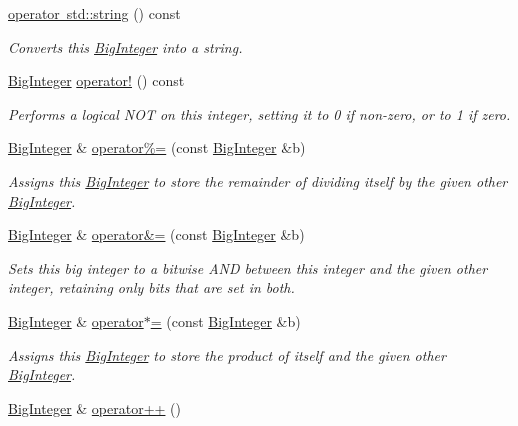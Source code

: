 \begin{DoxyCompactItemize}
\mbox{\hyperlink{classBigInteger_a3888dcd59dd5acd1ca5b9bee4c2e252a}{operator std\+::string}} () const
\begin{DoxyCompactList}\small\item\em Converts this \mbox{\hyperlink{classBigInteger}{Big\+Integer}} into a string. \end{DoxyCompactList}\item 
\mbox{\hyperlink{classBigInteger}{Big\+Integer}} \mbox{\hyperlink{classBigInteger_a4e89621e8562bf05700c80653d1b046a}{operator!}} () const
\begin{DoxyCompactList}\small\item\em Performs a logical N\+OT on this integer, setting it to 0 if non-\/zero, or to 1 if zero. \end{DoxyCompactList}\item 
\mbox{\hyperlink{classBigInteger}{Big\+Integer}} \& \mbox{\hyperlink{classBigInteger_a96b27db3901272401a277296b1344bff}{operator\%=}} (const \mbox{\hyperlink{classBigInteger}{Big\+Integer}} \&b)
\begin{DoxyCompactList}\small\item\em Assigns this \mbox{\hyperlink{classBigInteger}{Big\+Integer}} to store the remainder of dividing itself by the given other \mbox{\hyperlink{classBigInteger}{Big\+Integer}}. \end{DoxyCompactList}\item 
\mbox{\hyperlink{classBigInteger}{Big\+Integer}} \& \mbox{\hyperlink{classBigInteger_a350cb892980e2cd70d9ad9727fc546ac}{operator\&=}} (const \mbox{\hyperlink{classBigInteger}{Big\+Integer}} \&b)
\begin{DoxyCompactList}\small\item\em Sets this big integer to a bitwise A\+ND between this integer and the given other integer, retaining only bits that are set in both. \end{DoxyCompactList}\item 
\mbox{\hyperlink{classBigInteger}{Big\+Integer}} \& \mbox{\hyperlink{classBigInteger_a0f26aa4e4983f70261eb9ca87f97fd2a}{operator$\ast$=}} (const \mbox{\hyperlink{classBigInteger}{Big\+Integer}} \&b)
\begin{DoxyCompactList}\small\item\em Assigns this \mbox{\hyperlink{classBigInteger}{Big\+Integer}} to store the product of itself and the given other \mbox{\hyperlink{classBigInteger}{Big\+Integer}}. \end{DoxyCompactList}\item 
\mbox{\hyperlink{classBigInteger}{Big\+Integer}} \& \mbox{\hyperlink{classBigInteger_a9b078c3ae515fa998cac3395a8dff879}{operator++}} ()

\end{DoxyCompactItemize}
